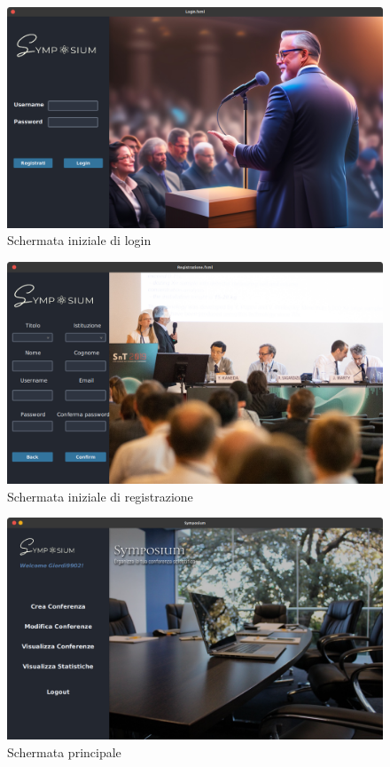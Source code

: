 \begin{figure}[h!]
	\centering
	\includegraphics[scale=0.2]{Immagini/Login.png}
	\caption{Schermata iniziale di login}\label{login}
\end{figure}
\begin{figure}[h!]
	\centering
	\includegraphics[scale=0.2]{Immagini/Mockup/Registrazione.png}
	\caption{Schermata iniziale di registrazione}
\end{figure}
\begin{figure}[h!]
	\centering
	\includegraphics[scale=0.2]{Immagini/Mockup/Landing.png}
	\caption{Schermata principale}
\end{figure}
